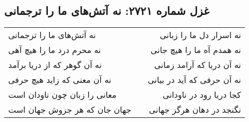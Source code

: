 \begin{center}
\section*{غزل شماره ۲۷۲۱: نه آتش‌های ما را ترجمانی}
\label{sec:2721}
\begin{longtable}{l p{0.5cm} r}
نه آتش‌های ما را ترجمانی
&&
نه اسرار دل ما را زبانی
\\
نه محرم درد ما را هیچ آهی
&&
نه همدم آه ما را هیچ جانی
\\
نه آن گوهر که از دریا برآمد
&&
نه آن دریا که آرامد زمانی
\\
نه آن معنی که زاید هیچ حرفی
&&
نه آن حرفی که آید در بیانی
\\
معانی را زبان چون ناودان است
&&
کجا دریا رود در ناودانی
\\
جهان جان که هر جزوش جهان است
&&
نگنجد در دهان هرگز جهانی
\\
\end{longtable}
\end{center}
